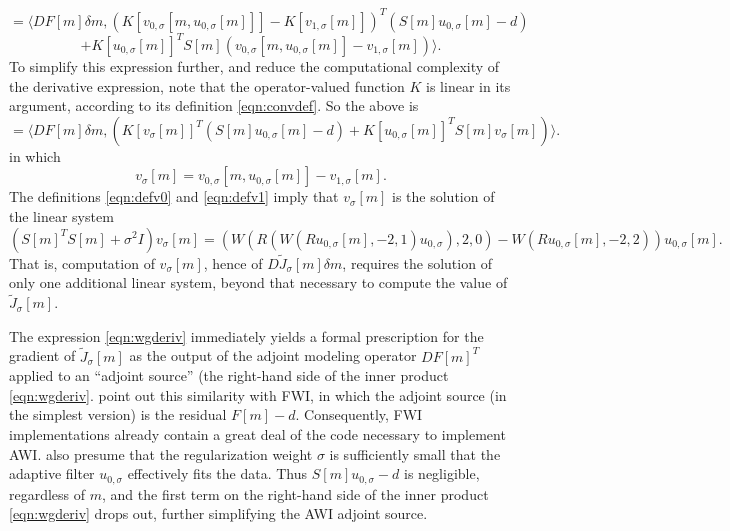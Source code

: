 \[
  = \langle DF[m]\delta
  m,(K[v_{0,\sigma}[m,u_{0,\sigma}[m]]]-K[v_{1,\sigma}[m]])^T(S[m]u_{0,\sigma}[m]-d)
\]
\[
  + K[u_{0,\sigma}[m]]^T S[m] (v_{0,\sigma}[m,u_{0,\sigma}[m]] -
  v_{1,\sigma}[m]) \rangle.
\]
To simplify this expression further, and reduce the computational
complexity of the derivative expression, note that the
operator-valued function $K$ is linear in its argument, according to
its definition \ref{eqn:convdef}. So the above is
\begin{equation}
  \label{eqn:wgderiv}
  = \langle DF[m]\delta m, (K[v_{\sigma}[m]]^T(S[m]u_{0,\sigma}[m]-d) 
  + K[u_{0,\sigma}[m]]^T S[m] v_{\sigma}[m] )\rangle.
\end{equation}
in which
\[
  v_{\sigma}[m] = v_{0,\sigma}[m,u_{0,\sigma}[m]] -  v_{1,\sigma}[m].
\]
The definitions \ref{eqn:defv0} and \ref{eqn:defv1} imply that
$v_{\sigma}[m]$ is the solution of the linear system
\begin{equation}
  \label{eqn:defvsigma}
  (S[m]^TS[m]+ \sigma^2I) v_{\sigma}[m] =
  (W(R(W(Ru_{0,\sigma}[m],-2,1)u_{0,\sigma}),2,0) - W(Ru_{0,\sigma}[m],-2,2))
  u_{0,\sigma}[m].
\end{equation}
That is, computation of $v_{\sigma}[m]$, hence of $D
\tilde{J}_{\sigma}[m]\delta m$, requires the solution of only one additional
linear system, beyond that necessary to compute the value of $\tilde{J}_{\sigma}[m]$.

 The expression \ref{eqn:wgderiv} immediately
yields a formal prescription for the gradient of
$\tilde{J}_{\sigma}[m]$ as the output of the adjoint modeling operator
$DF[m]^T$ applied to an ``adjoint source'' (the right-hand side of the
inner product \ref{eqn:wgderiv}. \cite{Warner:16} point out this
similarity with FWI, in which the adjoint source (in the simplest
version) is the residual $F[m]-d$. Consequently, FWI implementations
already contain a great deal of the code necessary to implement
AWI. \cite{Warner:16} also presume that the regularization weight
$\sigma$ is sufficiently small that the adaptive filter $u_{0,\sigma}$
effectively fits the data. Thus $S[m]u_{0,\sigma}-d$ is negligible,
regardless of $m$, and the first term on the right-hand side of the
inner product \ref{eqn:wgderiv} drops out, further simplifying the AWI
adjoint source.

